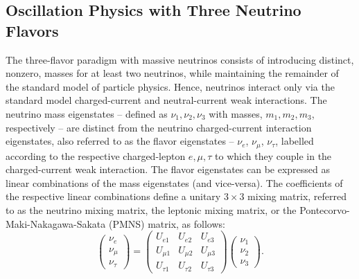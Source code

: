 \subsection{Oscillation Physics with Three Neutrino Flavors}

The three-flavor paradigm with massive neutrinos consists of introducing distinct, nonzero, masses for at least two neutrinos, while maintaining the remainder of the standard model of particle physics. Hence, neutrinos interact only via the standard model charged-current and neutral-current weak interactions. The neutrino mass eigenstates -- defined as $\nu_1,\nu_2, \nu_3$ with masses, $m_1, m_2, m_3$, respectively -- are distinct from the neutrino charged-current interaction eigenstates, also referred to as the flavor eigenstates -- $\nu_e$, $\nu_{\mu}$, $\nu_{\tau}$, labelled according to the respective charged-lepton $e,\mu,\tau$ to which they couple in the charged-current weak interaction. The flavor eigenstates can be expressed as linear combinations of the mass eigenstates (and vice-versa). The coefficients of the respective linear combinations define a unitary $3\times 3$ mixing matrix, referred to as the neutrino mixing matrix, the leptonic mixing matrix, or the Pontecorvo-Maki-Nakagawa-Sakata (PMNS) matrix, as follows:
\begin{equation}
\left(\begin{array}{c} \nu_e \\ \nu_{\mu} \\ \nu_{\tau} \end{array}\right) = \left(\begin{array}{ccc} U_{e1} & U_{e2} & U_{e3} \\  U_{\mu1} & U_{\mu2} & U_{\mu3}  \\  U_{\tau1} & U_{\tau2} & U_{\tau3}  \end{array}\right) \left(\begin{array}{c} \nu_1 \\ \nu_2 \\ \nu_3 \end{array}\right).
\end{equation}
